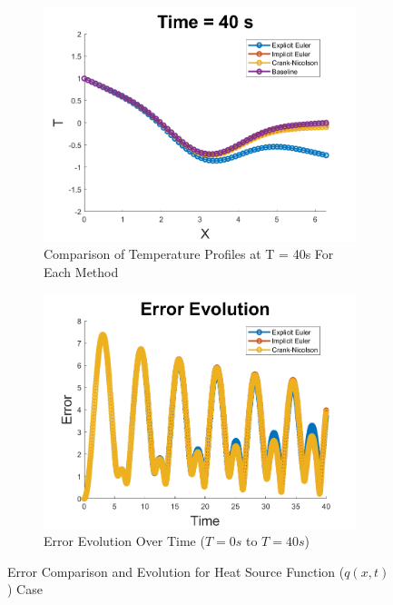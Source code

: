 \documentclass[10pt, letter, showtrims]{extarticle}
\begin{document}
		\FloatBarrier
		\begin{figure}[!h]
			\captionsetup[subfigure]{justification=centering}
			\centering
			
			\begin{subfigure}{.45\textwidth}
				\centering
				\includegraphics[width=1\linewidth]{"Figures/MATLAB/SourceCompare"}
				\caption{Comparison of Temperature Profiles at T = 40s For Each Method}
				\label{fig:compnosource}
			\end{subfigure}
			\begin{subfigure}{.45\textwidth}
				\centering
				\includegraphics[width=1\linewidth]{"Figures/MATLAB/SourceErrorTime"}
				\caption{Error Evolution Over Time ($T = 0s$ to $T = 40s$)}
				\label{fig:evolutionnosource}
			\end{subfigure}
			
			\caption{Error Comparison and Evolution for Heat Source Function ($q(x, t)$) Case}
			\label{fig:nosource}
		\end{figure}
		\FloatBarrier
		
\end{document}
